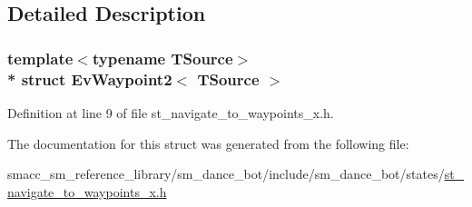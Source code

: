 \subsection{Detailed Description}
\subsubsection*{template$<$typename T\+Source$>$\\*
struct Ev\+Waypoint2$<$ T\+Source $>$}



Definition at line 9 of file st\+\_\+navigate\+\_\+to\+\_\+waypoints\+\_\+x.\+h.



The documentation for this struct was generated from the following file\+:\begin{DoxyCompactItemize}
\item 
smacc\+\_\+sm\+\_\+reference\+\_\+library/sm\+\_\+dance\+\_\+bot/include/sm\+\_\+dance\+\_\+bot/states/\hyperlink{st__navigate__to__waypoints__x_8h}{st\+\_\+navigate\+\_\+to\+\_\+waypoints\+\_\+x.\+h}\end{DoxyCompactItemize}
